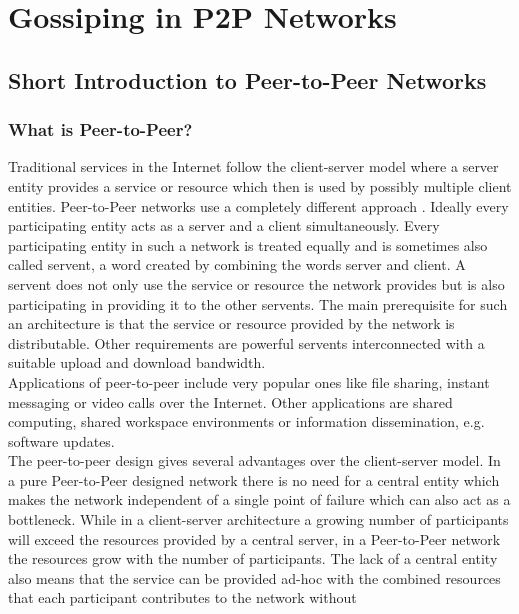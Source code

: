 \chapter{Gossiping in P2P Networks} 
\label{chap:gossiping}


\section{Short Introduction to Peer-to-Peer Networks}
\subsection{What is Peer-to-Peer?}
Traditional services in the Internet follow the client-server model where a
server entity provides a service or resource which then is used by
possibly multiple client entities. Peer-to-Peer networks use a completely
different approach \cite{Wehrle2005}. Ideally every participating entity acts as
a server and a client simultaneously. Every participating entity in such a network is treated
equally and is sometimes also called servent, a word created by combining the
words server and client. A servent does not only use the service or resource
the network provides but is also participating in providing it to the other
servents. The main prerequisite for such an architecture is that the service or
resource provided by the network is distributable. Other requirements are
powerful servents interconnected with a suitable upload and download bandwidth.
\\%
Applications of peer-to-peer include very popular ones like file
sharing, instant messaging or video calls over the Internet. Other applications
are shared computing, shared workspace environments or information
dissemination, e.g. software updates.
\\%
The peer-to-peer design gives several advantages over the client-server model.
In a pure Peer-to-Peer designed network there is no need for a central entity
which makes the network independent of a single point of failure which can also
act as a bottleneck. While in a client-server architecture a growing number of
participants will exceed the resources provided by a central server, in a
Peer-to-Peer network the resources grow with the number of participants. The
lack of a central entity also means that the service can be provided ad-hoc with
the combined resources that each participant contributes to the network without
